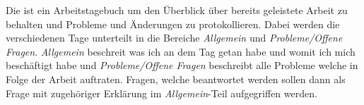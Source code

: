Die ist ein Arbeitstagebuch um den Überblick über bereits geleistete Arbeit zu behalten und Probleme und Änderungen zu protokollieren.
Dabei werden die verschiedenen Tage unterteilt in die Bereiche \emph{Allgemein} und \emph{Probleme/Offene Fragen}. \emph{Allgemein} beschreit was ich an dem Tag getan habe und womit ich mich beschäftigt habe und \emph{Probleme/Offene Fragen} beschreibt alle Probleme welche in Folge der Arbeit auftraten. Fragen, welche beantwortet werden sollen dann als Frage mit zugehöriger Erklärung im \emph{Allgemein}-Teil aufgegriffen werden.